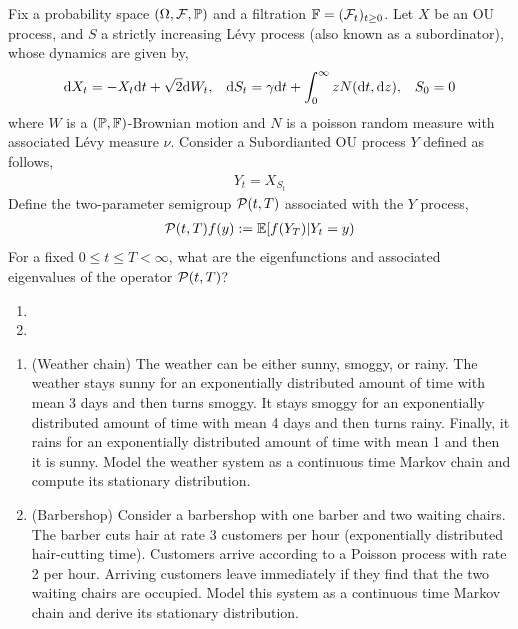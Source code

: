 \begin{problem}
    Fix a probability space \( (\Omega,\mathcal{F},\mathbb{P}) \) and a filtration \( \mathbb{F} = (\mathcal{F}_t)_{t\geq 0} \). Let \( X \) be an OU process, and \( S \) a strictly increasing L\'evy process (also known as a subordinator), whose dynamics are given by,
    \begin{align*}
        \mathrm{d} X_t = - X_t \mathrm{d} t + \sqrt{2}\mathrm{d} W_t, && \mathrm{d} S_t = \gamma \mathrm{d} t + \int_0^\infty z N(\mathrm{d} t,\mathrm{d} z), && S_0 = 0
    \end{align*}
    where \( W \) is a \( (\mathbb{P},\mathbb{F}) \)-Brownian motion and \( N \) is a poisson random measure with associated L\'evy measure \( \nu \). Consider a Subordianted OU process \( Y \) defined as follows,
    \begin{align*}
        Y_t = X_{S_t}
    \end{align*}
    Define the two-parameter semigroup \( \mathcal{P}(t,T) \) associated with the \( Y \) process,
    \begin{align*}
        \mathcal{P}(t,T) f(y) := \mathbb{E}[f(Y_T) | Y_t = y)
    \end{align*}
    For a fixed \( 0\leq t\leq T <\infty \), what are the eigenfunctions and associated eigenvalues of the operator \( \mathcal{P}(t,T) \)?
\end{problem}

\begin{solution}[Solution]
\begin{enumerate}[label=(\alph*)]
    \item 
    \item 
\end{enumerate}
\end{solution}


\begin{problem}
\begin{enumerate}[nolistsep,label=(\alph*)]
    \item (Weather chain) The weather can be either sunny, smoggy, or rainy. The weather stays sunny for an exponentially distributed amount of time with mean 3 days and then turns smoggy. It stays smoggy for an exponentially distributed amount of time with mean 4 days and then turns rainy. Finally, it rains for an exponentially distributed amount of time with mean 1 and then it is sunny. Model the weather system as a continuous time Markov chain and compute its stationary distribution.
    \item (Barbershop) Consider a barbershop with one barber and two waiting chairs. The barber cuts hair at rate 3 customers per hour (exponentially distributed hair-cutting time). Customers arrive according to a Poisson process with rate 2 per hour. Arriving customers leave immediately if they find that the two waiting chairs are occupied. Model this system as a continuous time Markov chain and derive its stationary distribution.
\end{enumerate}
\end{problem}

